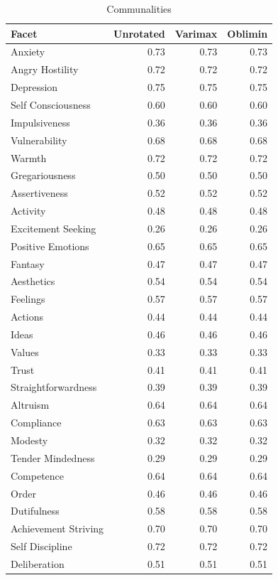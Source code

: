 \documentclass{article}\usepackage[]{graphicx}\usepackage[]{color}
\newenvironment{knitrout}{}{} %
\begin{document}
\begin{knitrout}
\begin{table}
\caption{\label{tab:unnamed-chunk-12}Communalities}
\centering
\begin{tabular}[t]{lrrr}
\toprule
Facet & Unrotated & Varimax & Oblimin\\
\midrule
Anxiety & 0.73 & 0.73 & 0.73\\
Angry Hostility & 0.72 & 0.72 & 0.72\\
Depression & 0.75 & 0.75 & 0.75\\
Self Consciousness & 0.60 & 0.60 & 0.60\\
Impulsiveness & 0.36 & 0.36 & 0.36\\
\addlinespace
Vulnerability & 0.68 & 0.68 & 0.68\\
Warmth & 0.72 & 0.72 & 0.72\\
Gregariousness & 0.50 & 0.50 & 0.50\\
Assertiveness & 0.52 & 0.52 & 0.52\\
Activity & 0.48 & 0.48 & 0.48\\
\addlinespace
Excitement Seeking & 0.26 & 0.26 & 0.26\\
Positive Emotions & 0.65 & 0.65 & 0.65\\
Fantasy & 0.47 & 0.47 & 0.47\\
Aesthetics & 0.54 & 0.54 & 0.54\\
Feelings & 0.57 & 0.57 & 0.57\\
\addlinespace
Actions & 0.44 & 0.44 & 0.44\\
Ideas & 0.46 & 0.46 & 0.46\\
Values & 0.33 & 0.33 & 0.33\\
Trust & 0.41 & 0.41 & 0.41\\
Straightforwardness & 0.39 & 0.39 & 0.39\\
\addlinespace
Altruism & 0.64 & 0.64 & 0.64\\
Compliance & 0.63 & 0.63 & 0.63\\
Modesty & 0.32 & 0.32 & 0.32\\
Tender Mindedness & 0.29 & 0.29 & 0.29\\
Competence & 0.64 & 0.64 & 0.64\\
\addlinespace
Order & 0.46 & 0.46 & 0.46\\
Dutifulness & 0.58 & 0.58 & 0.58\\
Achievement Striving & 0.70 & 0.70 & 0.70\\
Self Discipline & 0.72 & 0.72 & 0.72\\
Deliberation & 0.51 & 0.51 & 0.51\\
\bottomrule
\end{tabular}
\end{table}


\end{knitrout}
\end{document}
